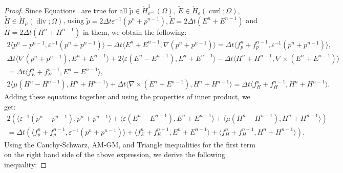 \documentclass{amsart}
\theoremstyle{thmstyleone}%
\theoremstyle{thmstyletwo}%
\theoremstyle{thmstylethree}%
\DeclareMathOperator{\curl}{curl}
\def\divgn{\operatorname{div}}
\newcommand{\aInnerproduct}[2]{\bigl\langle #1, #2 \bigr\rangle}
\begin{document}
\begin{proof}
Since Equations~ are true for all $\widetilde{p}\in \mathring{H}^1_{\varepsilon^{-1}}(\Omega)$, $\widetilde{E} \in \mathring{H}_{\varepsilon}(\curl; \Omega)$, $\widetilde{H} \in \mathring{H}_{\mu}(\divgn; \Omega)$, using $\widetilde{p} = 2 \Delta t \varepsilon^{-1} \left(p^n + p^{n-1}\right), \widetilde{E} = 2 \Delta t \left(E^n + E^{n-1}\right) $ and $\widetilde{H} = 2 \Delta t \left(H^n + H^{n-1}\right)$ in them, we obtain the following:
\begin{multline*}
  2 \aInnerproduct{p^n - p^{n-1}}{\varepsilon^{-1} \left( p^n + p^{n-1} \right)} -
  \Delta t \aInnerproduct{E^n + E^{n-1}}{\nabla \left(p^n + p^{n-1}\right)} =
  \Delta t \aInnerproduct{f_p^n + f_p^{n-1}}{\varepsilon^{-1} \left(p^n + p^{n-1}\right)},
\end{multline*}
\vspace{-1em} \begin{multline*}
  \Delta t \aInnerproduct{\nabla \left(p^n + p^{n-1} \right)}{E^n + E^{n-1}} +  2 \aInnerproduct{\varepsilon \left(E^n - E^{n-1}\right)}{E^n + E^{n-1}} -
  \Delta t \aInnerproduct{H^n + H^{n-1}}{\nabla \times \left(E^n + E^{n-1}\right)} \\ = \Delta t \aInnerproduct{f_E^n + f_E^{n-1}}{E^n + E^{n-1}},
\end{multline*}
\vspace{-1em} \begin{multline*}
  2 \aInnerproduct{\mu \left(H^n - H^{n-1} \right)}{H^n + H^{n-1}} + \Delta t \aInnerproduct{\nabla \times \left(E^n + E^{n-1} \right)}{H^n + H^{n-1}} = \Delta t \aInnerproduct{ f_H^n + f_H^{n-1}}{H^n + H^{n-1}}. 
\end{multline*}
Adding these equations together and using the properties of inner product, we get:
\begin{multline}
  2 \left( \aInnerproduct{\varepsilon^{-1} \left(p^n - p^{n - 1} \right)}{p^n + p^{n - 1}} + \right. \aInnerproduct{\varepsilon \left(E^n - E^{n - 1} \right)}{E^n + E^{n - 1}} + 
  \left. \aInnerproduct{\mu \left( H^n - H^{n - 1} \right)}{H^n + H^{n - 1}} \right) \\
  = \Delta t \left( \aInnerproduct{f_p^n + f_p^{n - 1}}{\varepsilon^{-1} \left( p^n + p^{n - 1} \right)} + \aInnerproduct{f_E^n + f_E^{n - 1}}{E^n + E^{n - 1}} + \aInnerproduct{ f_H^n + f_H^{n - 1}}{H^n + H^{n - 1}} \right). \label{eqn:p+E+H_cn}
\end{multline}
Using the Cauchy-Schwarz, AM-GM, and Triangle inequalities for the first term on the right hand side of the above expression, we derive the following inequality:

\end{proof}
\end{document}
